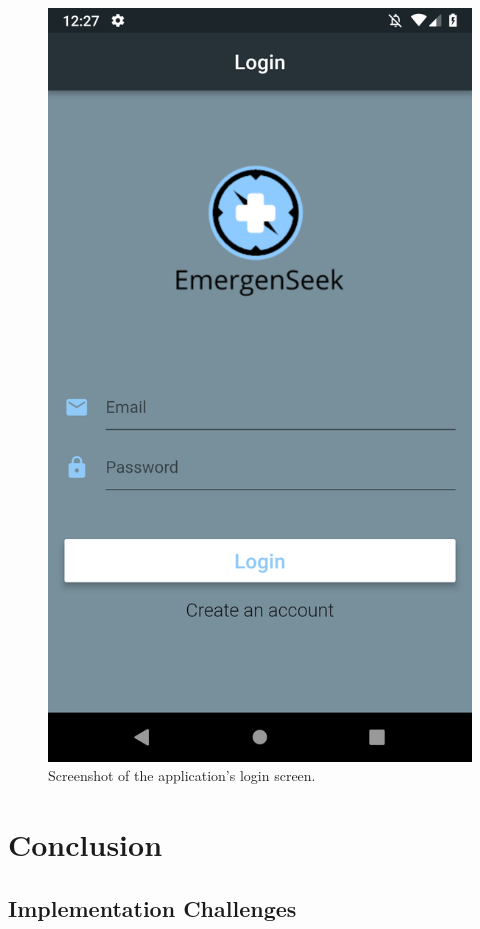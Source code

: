 \documentclass[10pt, a4paper]{article}
\begin{document}
\begin{figure}[H]
  \includegraphics[width=\linewidth]{final-diagrams/Emulator-Screenshots/Screenshot_1556126840.png}
  \caption{Screenshot of the application's login screen.}
\endminipage\hfill
\end{figure}

\section{Conclusion}
\subsection{Implementation Challenges}
\end{document}
